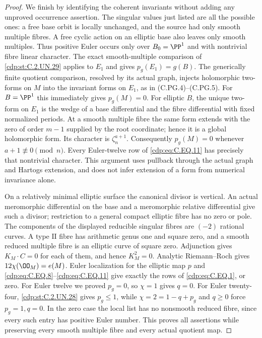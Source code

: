 \begin{proof}
We finish by identifying the coherent invariants
without adding any unproved occurrence assertion.
The singular values just listed are all the possible
ones: a free base orbit is locally unchanged, and
the source had only smooth multiple fibres.
A free cyclic action on an elliptic base also leaves
only smooth multiples. Thus positive Euler occurs
only over $B_0=\PP^1$ and with nontrivial fibre
linear character. The exact smooth-multiple comparison
of \ref{cdp:st:C.2.UN.29} applies to $E_1$ and gives $p_g(E_1)=g(B)$.
The generically finite quotient comparison, resolved
by its actual graph, injects holomorphic two-forms
on $M$ into the invariant forms on $E_1$, as in
(C.PG.4)--(C.PG.5).
For $B=\PP^1$ this immediately gives $p_g(M)=0$.
For elliptic $B$, the unique two-form on $E_1$ is
the wedge of a base differential and the fibre
differential with fixed normalized periods. At a
smooth multiple fibre the same form extends with
the zero of order $m-1$ supplied by the root
coordinate; hence it is a global holomorphic form.
Its character is $\zeta_n^{a+1}$. Consequently
$p_g(M)=0$ whenever $a+1\not\equiv0\pmod n$.
Every Euler-twelve row of \eqref{cdp:eq:C.EQ.11} has precisely
that nontrivial character. This argument uses
pullback through the actual graph and Hartogs
extension, and does not infer extension of a
form from numerical invariance alone.

On a relatively minimal elliptic surface the canonical
divisor is vertical. An actual meromorphic differential
on the base and a meromorphic relative differential
give such a divisor; restriction to a general compact
elliptic fibre has no zero or pole. The components
of the displayed reducible singular fibres are $(-2)$
rational curves. A type $\mathrm{II}$ fibre has arithmetic
genus one and square zero, and a smooth reduced multiple
fibre is an elliptic curve of square zero. Adjunction gives
$K_M\cdot C=0$ for each of them, and hence $K_M^2=0$.
Analytic Riemann--Roch gives
$12\chi(\OO_M)=e(M)$. Euler localization for the
elliptic map $p$ and \eqref{cdp:eq:C.EQ.8}--\eqref{cdp:eq:C.EQ.11} give
exactly the rows of \eqref{cdp:eq:C.EQ.1}, or zero. For Euler
twelve we proved $p_g=0$, so $\chi=1$ gives $q=0$.
For Euler twenty-four, \ref{cdp:st:C.2.UN.28} gives $p_g\le1$, while
$\chi=2=1-q+p_g$ and $q\ge0$ force $p_g=1,q=0$.
In the zero case
the local list has no nonsmooth reduced fibre,
since every such entry has positive Euler number.
This proves all assertions while preserving every
smooth multiple fibre and every actual quotient map.
\end{proof}


